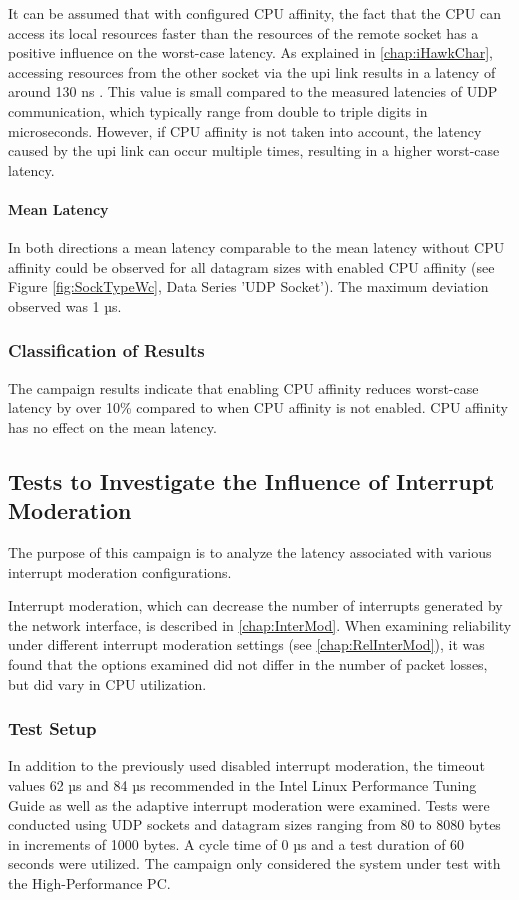 It can be assumed that with configured \ac{CPU} affinity, the fact that the \ac{CPU} can access its local resources faster than the resources of the remote socket has a positive influence on the worst-case latency. As explained in \ref{chap:iHawkChar}, accessing resources from the other socket via the \ac{upi} link results in a latency of around 130 ns \cite{setup07}. This value is small compared to the measured latencies of UDP communication, which typically range from double to triple digits in microseconds. However, if \ac{CPU} affinity is not taken into account, the latency caused by the \ac{upi} link can occur multiple times, resulting in a higher worst-case latency.

\paragraph{Mean Latency}

In both directions a mean latency comparable to the mean latency without \ac{CPU} affinity could be observed for all datagram sizes with enabled \ac{CPU} affinity (see Figure \ref{fig:SockTypeWc}, Data Series 'UDP Socket'). The maximum deviation observed was 1 µs.

\subsubsection{Classification of Results}
The campaign results indicate that enabling \ac{CPU} affinity reduces worst-case latency by over 10\% compared to when \ac{CPU} affinity is not enabled. \ac{CPU} affinity has no effect on the mean latency.

\subsection{Tests to Investigate the Influence of Interrupt Moderation}
The purpose of this campaign is to analyze the latency associated with various interrupt moderation configurations.

Interrupt moderation, which can decrease the number of interrupts generated by the network interface, is described in \ref{chap:InterMod}. When examining reliability under different interrupt moderation settings (see \ref{chap:RelInterMod}), it was found that the options examined did not differ in the number of packet losses, but did vary in \ac{CPU} utilization.

\subsubsection{Test Setup}
In addition to the previously used disabled interrupt moderation, the timeout values 62 µs and 84 µs recommended in the Intel Linux Performance Tuning Guide \cite{intermod03} as well as the adaptive interrupt moderation were examined. Tests were conducted using UDP sockets and datagram sizes ranging from 80 to 8080 bytes in increments of 1000 bytes. A cycle time of 0 µs and a test duration of 60 seconds were utilized. The campaign only considered the system under test with the High-Performance PC.


